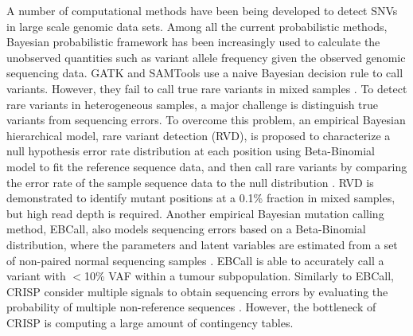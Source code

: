 \documentclass[11pt,reqno]{amsart}
\begin{document}
A number of computational methods have been being developed to detect SNVs in large scale genomic data sets.
Among all the current probabilistic methods, Bayesian probabilistic framework has been increasingly used to calculate the unobserved quantities such as variant allele frequency given the observed genomic sequencing data.
GATK \citep{mckenna2010genome} and SAMTools \citep{li2009sequence} use a naive Bayesian decision rule to call variants.
However, they fail to call true rare variants in mixed samples \citep{he2015rvd2}.
To detect rare variants in heterogeneous samples, a major challenge is distinguish true variants from sequencing errors.
To overcome this problem, an empirical Bayesian hierarchical model, rare variant detection (RVD), is proposed to characterize a null hypothesis error rate distribution at each position using Beta-Binomial model to fit the reference sequence data, and then call rare variants by comparing the error rate of the sample sequence data to the null distribution \citep{flaherty2011ultrasensitive}.
RVD is demonstrated to identify mutant positions at a 0.1\% fraction in mixed samples, but high read depth is required.
Another empirical Bayesian mutation calling method, EBCall, also models sequencing errors based on a Beta-Binomial distribution, where the parameters and latent variables are estimated from a set of non-paired normal sequencing samples \citep{shiraishi2013empirical}.
EBCall is able to accurately call a variant with $<$10\% VAF within a tumour subpopulation.
Similarly to EBCall, CRISP consider multiple signals to obtain sequencing errors by evaluating the probability of multiple non-reference sequences \citep{bansal2010statistical}. However, the bottleneck of CRISP is computing a large amount of contingency tables.
\end{document}
